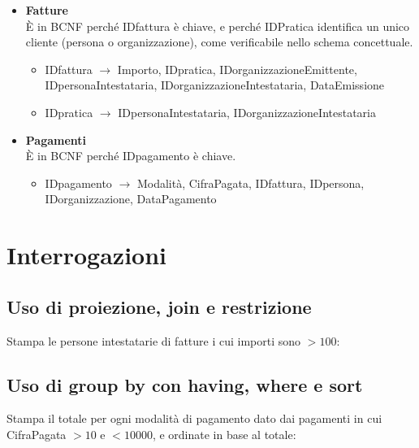 \documentclass[a4paper,12pt]{article}
\begin{document}
\begin{itemize}
\item \textbf{Fatture}\\È in BCNF perché IDfattura è chiave, e perché IDPratica identifica un unico cliente (persona o organizzazione), come verificabile nello schema concettuale.

\begin{itemize}
\item IDfattura $\rightarrow$ Importo, IDpratica, IDorganizzazioneEmittente, IDpersonaIntestataria, IDorganizzazioneIntestataria, DataEmissione

\item IDpratica $\rightarrow$ IDpersonaIntestataria, IDorganizzazioneIntestataria
\end{itemize}

\item \textbf{Pagamenti}\\È in BCNF perché IDpagamento è chiave.

\begin{itemize}
\item IDpagamento $\rightarrow$ Modalità, CifraPagata, IDfattura, IDpersona, IDorganizzazione, DataPagamento
\end{itemize}

\end{itemize}

 \section{ Interrogazioni }


 \subsection{ Uso di proiezione, join e restrizione }
Stampa le persone intestatarie di fatture i cui importi sono $> 100$:

\begin{minipage}{\textwidth}

\end{minipage}


 \subsection{ Uso di group by con having, where e sort }

Stampa il totale per ogni modalità di pagamento dato dai pagamenti in cui CifraPagata $> 10$ e $< 10000$, e ordinate in base al totale:

\begin{minipage}{\textwidth}

\end{minipage}
\end{document}
